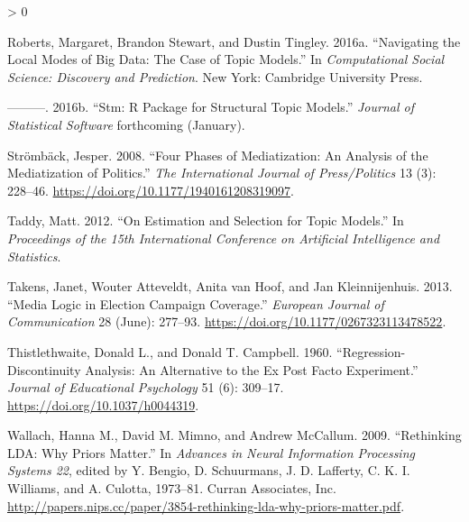\documentclass[
  12pt,
]{article}
\newlength{\cslhangindent}
\newenvironment{CSLReferences}[2] %
 {%
  \setlength{\parindent}{0pt}
  \ifodd #1 \everypar{\setlength{\hangindent}{\cslhangindent}}\ignorespaces\fi
  \ifnum #2 > 0
  \setlength{\parskip}{#2\baselineskip}
  \fi
 }%
 {}
\begin{document}
\begin{CSLReferences}{1}{0}
\leavevmode\hypertarget{ref-roberts_navigating_2016}{}%
Roberts, Margaret, Brandon Stewart, and Dustin Tingley. 2016a.
{``Navigating the Local Modes of Big Data: The Case of Topic Models.''}
In \emph{Computational Social Science: Discovery and Prediction}. New
York: Cambridge University Press.

\leavevmode\hypertarget{ref-roberts_stm:_2016}{}%
---------. 2016b. {``Stm: R Package for Structural Topic Models.''}
\emph{Journal of Statistical Software} forthcoming (January).

\leavevmode\hypertarget{ref-stromback_four_2008}{}%
Strömbäck, Jesper. 2008. {``Four Phases of Mediatization: An Analysis of
the Mediatization of Politics.''} \emph{The International Journal of
Press/Politics} 13 (3): 228--46.
\url{https://doi.org/10.1177/1940161208319097}.

\leavevmode\hypertarget{ref-taddy_estimation_2012}{}%
Taddy, Matt. 2012. {``On Estimation and Selection for Topic Models.''}
In \emph{Proceedings of the 15th International Conference on Artificial
Intelligence and Statistics}.

\leavevmode\hypertarget{ref-takens_media_2013}{}%
Takens, Janet, Wouter Atteveldt, Anita van Hoof, and Jan Kleinnijenhuis.
2013. {``Media Logic in Election Campaign Coverage.''} \emph{European
Journal of Communication} 28 (June): 277--93.
\url{https://doi.org/10.1177/0267323113478522}.

\leavevmode\hypertarget{ref-thistlethwaite_regression-discontinuity_1960}{}%
Thistlethwaite, Donald L., and Donald T. Campbell. 1960.
{``Regression-Discontinuity Analysis: An Alternative to the Ex Post
Facto Experiment.''} \emph{Journal of Educational Psychology} 51 (6):
309--17. \url{https://doi.org/10.1037/h0044319}.

\leavevmode\hypertarget{ref-wallach_rethinking_2009}{}%
Wallach, Hanna M., David M. Mimno, and Andrew McCallum. 2009.
{``Rethinking {LDA}: Why Priors Matter.''} In \emph{Advances in Neural
Information Processing Systems 22}, edited by Y. Bengio, D. Schuurmans,
J. D. Lafferty, C. K. I. Williams, and A. Culotta, 1973--81. Curran
Associates, Inc.
\url{http://papers.nips.cc/paper/3854-rethinking-lda-why-priors-matter.pdf}.

\end{CSLReferences}
\end{document}

